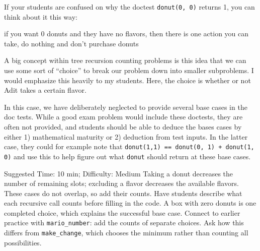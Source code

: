 \begin{questionmeta}
If your students are confused on why the doctest \lstinline{donut(0, 0)} returns 1, 
you can think about it this way:

if you want 0 donuts and they have no flavors, then there is one action you can take, do nothing and don't purchase donuts

A big concept within tree recursion counting problems is this idea that we can use some sort of ``choice'' to break our problem down into smaller subproblems. I would emphasize this heavily to my students. Here, the choice is whether or not Adit takes a certain flavor. 

In this case, we have deliberately neglected to provide several base cases in the doc tests. While a good exam problem would include these doctests, they are often not provided, and students should be able to deduce the bases cases by either 1) mathematical maturity or 2) deduction from test inputs. In the latter case, they could for example note that \lstinline{donut(1,1) == donut(0, 1) + donut(1, 0)} and use this to help figure out what \lstinline{donut} should return at these base cases. 

\end{questionmeta}

\begin{questionmeta}
    Suggested Time: 10 min; Difficulty: Medium
    Taking a donut decreases the number of remaining slots; excluding a flavor decreases the available flavors. These cases do not overlap, so add their counts. Have students describe what each recursive call counts before filling in the code. A box with zero donuts is one completed choice, which explains the successful base case. Connect to earlier practice with \lstinline{mario_number}: add the counts of separate choices. Ask how this differs from \lstinline{make_change}, which chooses the minimum rather than counting all possibilities.
\end{questionmeta}
